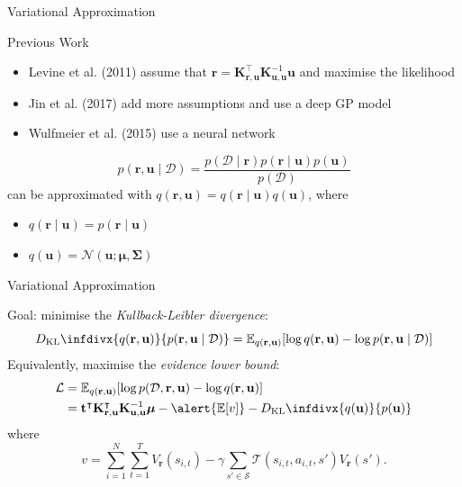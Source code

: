 \documentclass{beamer}
\newcommand{\Kuu}{\mathbf{K}_{\mathbf{u},\mathbf{u}}}
\newcommand{\Kru}{\mathbf{K}_{\mathbf{r},\mathbf{u}}}
\newcommand{\V}{V_{\mathbf{r}}}
\newcommand{\DKL}{D_{\mathrm{KL}}\infdivx}
\begin{document}
\begin{frame}{Variational Approximation}
  \begin{block}{Previous Work}
    \begin{itemize}
    \item Levine et al. (2011) assume that $\mathbf{r} =
      \Kru^\intercal\Kuu^{-1}\mathbf{u}$ and maximise the likelihood
    \item Jin et al. (2017) add more assumptions and use a deep GP model
    \item Wulfmeier et al. (2015) use a neural network
    \end{itemize}
  \end{block}
  \[
    p(\mathbf{r}, \mathbf{u} \mid \mathcal{D}) = \frac{p(\mathcal{D} \mid
      \mathbf{r})p(\mathbf{r} \mid \mathbf{u})p(\mathbf{u})}{p(\mathcal{D})}
  \]
  can be approximated with $q(\mathbf{r}, \mathbf{u}) = q(\mathbf{r} \mid
  \mathbf{u})q(\mathbf{u})$, where
  \begin{itemize}
  \item $q(\mathbf{r} \mid \mathbf{u}) = p(\mathbf{r} \mid \mathbf{u})$
  \item $q(\mathbf{u}) = \mathcal{N}(\mathbf{u}; \bm\mu, \bm\Sigma)$
  \end{itemize}
\end{frame}

\begin{frame}{Variational Approximation}
  \begin{figure}
    \centering
  \end{figure}
  Goal: \alert{minimise} the \emph{Kullback-Leibler divergence}:
  \[
    \DKL{q(\mathbf{r}, \mathbf{u})}{p(\mathbf{r}, \mathbf{u} \mid \mathcal{D})}
    = \mathbb{E}_{q(\mathbf{r}, \mathbf{u})}[\log q(\mathbf{r}, \mathbf{u}) -
    \log p(\mathbf{r}, \mathbf{u} \mid \mathcal{D})]
  \]
  Equivalently, \alert{maximise} the \emph{evidence lower bound}:
  \begin{align*}
    \mathcal{L} &= \mathbb{E}_{q(\mathbf{r}, \mathbf{u})}[\log p(\mathcal{D}, \mathbf{r}, \mathbf{u}) - \log q(\mathbf{r}, \mathbf{u})] \\
                &= \mathbf{t}^\intercal\Kru^\intercal\Kuu^{-1}\bm\mu - \alert{\mathbb{E}[v]} - \DKL{q(\mathbf{u})}{p(\mathbf{u})}
  \end{align*}
  where
  \[
    v = \sum_{i=1}^N \sum_{t=1}^T \V(s_{i,t}) - \gamma\sum_{s' \in \mathcal{S}}
    \mathcal{T}(s_{i,t}, a_{i,t}, s')\V(s').
  \]
\end{frame}
\end{document}
